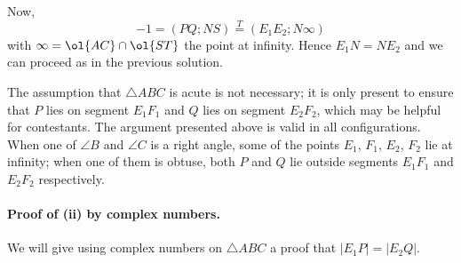 Now, \[ -1 = (PQ;NS) \overset{T}{=} (E_1E_2;N\infty) \]
with $\infty = \ol{AC} \cap \ol{ST}$ the point at infinity.
Hence $E_1 N = N E_2$ and we can proceed as in the previous solution.

%

\begin{remark*}
The assumption that $\triangle ABC$ is acute is not necessary; it is only present to ensure that $P$ lies on segment $E_1F_1$ and $Q$ lies on segment $E_2F_2$, which may be helpful for contestants. The argument presented above is valid in all configurations. When one of $\angle B$ and $\angle C$ is a right angle, some of the points $E_1$, $F_1$, $E_2$, $F_2$ lie at infinity; when one of them is obtuse, both $P$ and $Q$ lie outside segments $E_1F_1$ and $E_2F_2$ respectively.
\end{remark*}

\paragraph{Proof of (ii) by complex numbers.}
We will give using complex numbers on $\triangle ABC$
a proof that $|E_1P| = |E_2Q|$.

